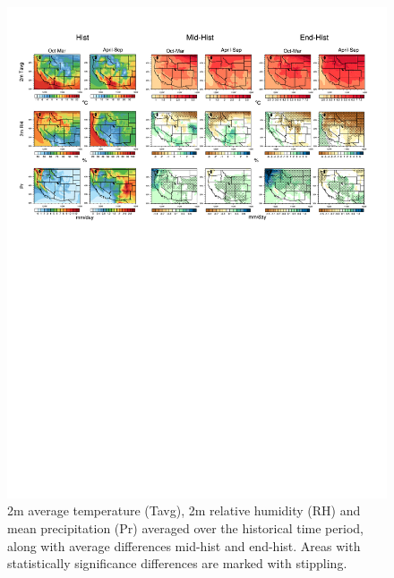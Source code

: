 \documentclass{ametsoc}
\begin{document}
\begin{figure}
\begin{center}
\includegraphics[width=8in, trim={0.6cm 15.5cm 1.0cm 1.0cm},clip]{pr_mean_clm.pdf}
\caption{2m average temperature (Tavg), 2m relative humidity (RH) and mean precipitation (Pr) averaged over the historical time period, along with average differences \textsf{mid}-\textsf{hist} and \textsf{end}-\textsf{hist}.  Areas with statistically significance differences are marked with stippling.}
\label{fig:meanClm}
\end{center}
\end{figure}
\end{document}

